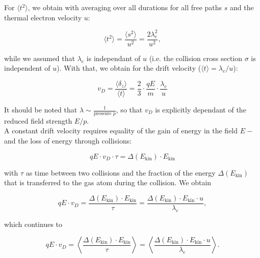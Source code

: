 For $\langle t^2 \rangle$, we obtain with averaging over all durations for all free paths $s$ and
the thermal electron velocity $u$:

\[ \langle t^2 \rangle = \frac{\langle s^2 \rangle}{u^2} = \frac{2\lambda_e^2}{u^2} ,\]

while we assumed that  $\lambda_e$ is independant of $u$ (i.e. the collision cross section $\sigma$
is independent of $u$). With that, we obtain for the drift velocity ($\langle t
\rangle=\lambda_e/u$):

\[v_D = \frac{\langle \delta_z \rangle}{\langle t\rangle} = \frac{2}{3}\cdot \frac{qE}{m}\cdot
\frac{\lambda_e}{u}\]

It should be noted that $\lambda\sim \frac{1}{\text{pressure }p}$, so that $v_D$ is explicitly
dependant of the reduced field strength $E/p$.
\\
A constant drift velocity requires equality of the gain of energy in the field $E-$ and the loss of
energy through collisions:

\[qE\cdot v_D\cdot \tau = \Delta(E_\text{kin})\cdot E_\text{kin}  \]

with $\tau$ as time between two collisions and the fraction of the energy $\Delta(E_\text{kin})$
that is transferred to the gas atom during the collision. We obtain

\[qE\cdot v_D = \frac{\Delta(E_\text{kin})\cdot E_\text{kin}}{\tau} =
\frac{\Delta(E_\text{kin})\cdot E_\text{kin}\cdot u}{\lambda_e}  ,\]

which continues to 

\[qE\cdot v_D = \left\langle \frac{\Delta(E_\text{kin})\cdot E_\text{kin}}{\tau} \right\rangle =
\left\langle \frac{\Delta(E_\text{kin})\cdot E_\text{kin}\cdot u}{\lambda_e}\right\rangle .\]


